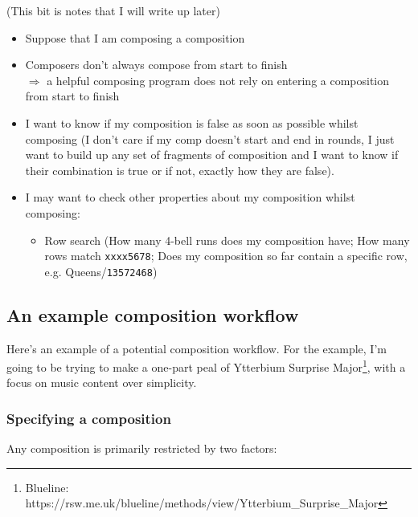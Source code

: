 \documentclass[12pt]{article}
\newcommand{\row}[1]{\texttt{#1}}
\begin{document}
(This bit is notes that I will write up later)

\begin{itemize}
    \item Suppose that I am composing a composition
    \item Composers don't always compose from start to finish \\
        $\Rightarrow$ a helpful composing program does not rely on entering a composition from
        start to finish
    \item I want to know if my composition is false as soon as possible whilst composing (I don't
        care if my comp doesn't start and end in rounds, I just want to build up any set of fragments
        of composition and I want to know if their combination is true or if not, exactly how they
        are false).
    \item I may want to check other properties about my composition whilst composing:
        \begin{itemize}
            \item Row search (How many 4-bell runs does my composition have;
                How many rows match \row{xxxx5678};
                Does my composition so far contain a specific row, e.g. Queens/\row{13572468})
        \end{itemize}
\end{itemize}

\subsection{An example composition workflow}

Here's an example of a potential composition workflow.  For the example, I'm going to be trying to
make a one-part peal of Ytterbium Surprise
Major\footnote{Blueline: https://rsw.me.uk/blueline/methods/view/Ytterbium\_Surprise\_Major}, with
a focus on music content over simplicity.

\subsubsection{Specifying a composition}

Any composition is primarily restricted by two factors:
\end{document}
